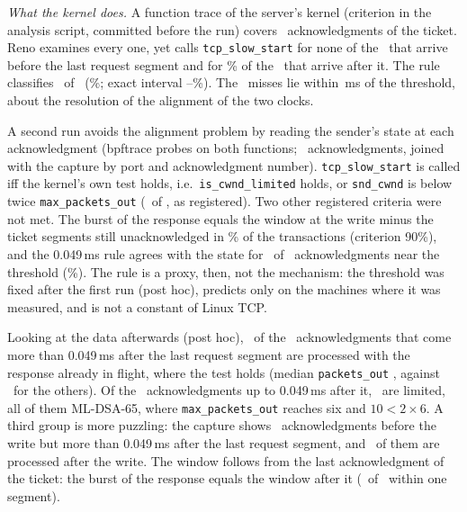 \documentclass[sigconf,9pt,nonacm]{acmart}
\newcommand{\ms}{\,ms\xspace}
\begin{document}
\emph{What the kernel does.} A function trace of the server's kernel (criterion in the analysis script, committed before the run) covers \KerN\ acknowledgments of the ticket. Reno examines every one, yet calls \texttt{tcp\_slow\_start} for none of the \KerBeforeN\ that arrive before the last request segment and for \KerAfterSS\% of the \KerAfterN\ that arrive after it. The rule classifies \KerRight\ of \KerN\ (\KerPct\%; exact interval \CiKerLo--\CiKerHi\%). The \KerWrong\ misses lie within \KerMissNear\ms of the threshold, about the resolution of the alignment of the two clocks.

A second run avoids the alignment problem by reading the sender's state at each acknowledgment (bpftrace probes on both functions; \StN\ acknowledgments, joined with the capture by port and acknowledgment number). \texttt{tcp\_\allowbreak slow\_\allowbreak start} is called iff the kernel's own test holds, i.e.\ \texttt{is\_\allowbreak cwnd\_\allowbreak limited} holds, or \texttt{snd\_\allowbreak cwnd} is below twice \texttt{max\_\allowbreak packets\_\allowbreak out} (\StPOneRight\ of \StPOneN, as registered). Two other registered criteria were not met. The burst of the response equals the window at the write minus the ticket segments still unacknowledged in \StPTwoPct\% of the transactions (criterion 90\%), and the 0.049\ms rule agrees with the state for \StPThreeRight\ of \StPThreeN\ acknowledgments near the threshold (\StPThreePct\%). The rule is a proxy, then, not the mechanism: the threshold was fixed after the first run (post hoc), predicts only on the machines where it was measured, and is not a constant of Linux TCP.

Looking at the data afterwards (post hoc), \StLateInflight\ of the \StLate\ acknowledgments that come more than 0.049\ms after the last request segment are processed with the response already in flight, where the test holds (median \texttt{packets\_out} \StAfterPk, against \StBeforePk\ for the others). Of the \StEarly\ acknowledgments up to 0.049\ms after it, \StEarlyLimited\ are limited, all of them ML-DSA-65, where \texttt{max\_packets\_out} reaches six and $10<2\times6$. A third group is more puzzling: the capture shows \StDeferredN\ acknowledgments before the write but more than 0.049\ms after the last request segment, and \StDeferred\ of them are processed after the write. The window follows from the last acknowledgment of the ticket: the burst of the response equals the window after it (\StPTwoBRight\ of \StPTwoBN\ within one segment).
\end{document}

